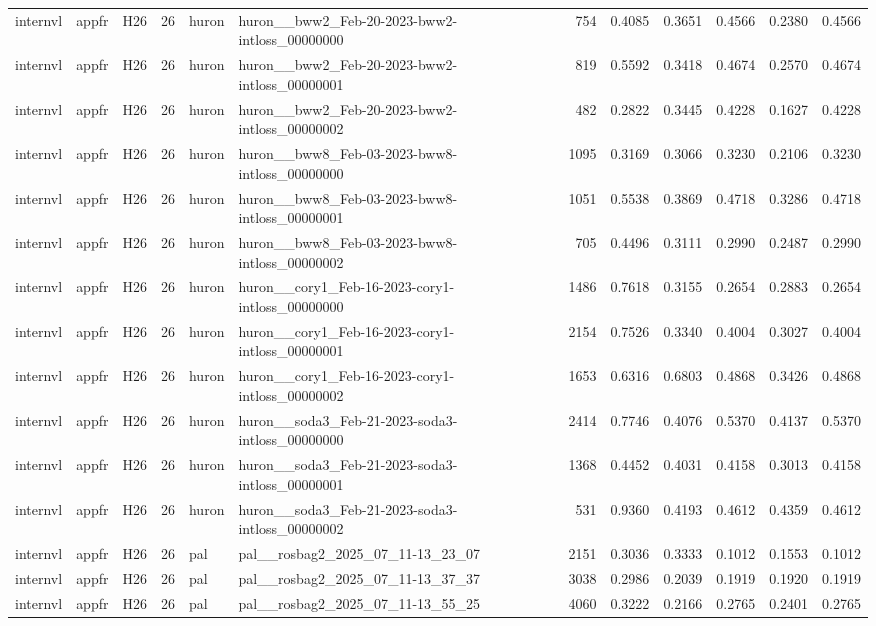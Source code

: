 \begin{table}[tbp]
\begin{tabular}{lllrllrrrrrr}
internvl & appfr & H26 & 26 & huron & huron\_\_bww2\_Feb-20-2023-bww2-intloss\_00000000 & 754 & 0.4085 & 0.3651 & 0.4566 & 0.2380 & 0.4566 \\
internvl & appfr & H26 & 26 & huron & huron\_\_bww2\_Feb-20-2023-bww2-intloss\_00000001 & 819 & 0.5592 & 0.3418 & 0.4674 & 0.2570 & 0.4674 \\
internvl & appfr & H26 & 26 & huron & huron\_\_bww2\_Feb-20-2023-bww2-intloss\_00000002 & 482 & 0.2822 & 0.3445 & 0.4228 & 0.1627 & 0.4228 \\
internvl & appfr & H26 & 26 & huron & huron\_\_bww8\_Feb-03-2023-bww8-intloss\_00000000 & 1095 & 0.3169 & 0.3066 & 0.3230 & 0.2106 & 0.3230 \\
internvl & appfr & H26 & 26 & huron & huron\_\_bww8\_Feb-03-2023-bww8-intloss\_00000001 & 1051 & 0.5538 & 0.3869 & 0.4718 & 0.3286 & 0.4718 \\
internvl & appfr & H26 & 26 & huron & huron\_\_bww8\_Feb-03-2023-bww8-intloss\_00000002 & 705 & 0.4496 & 0.3111 & 0.2990 & 0.2487 & 0.2990 \\
internvl & appfr & H26 & 26 & huron & huron\_\_cory1\_Feb-16-2023-cory1-intloss\_00000000 & 1486 & 0.7618 & 0.3155 & 0.2654 & 0.2883 & 0.2654 \\
internvl & appfr & H26 & 26 & huron & huron\_\_cory1\_Feb-16-2023-cory1-intloss\_00000001 & 2154 & 0.7526 & 0.3340 & 0.4004 & 0.3027 & 0.4004 \\
internvl & appfr & H26 & 26 & huron & huron\_\_cory1\_Feb-16-2023-cory1-intloss\_00000002 & 1653 & 0.6316 & 0.6803 & 0.4868 & 0.3426 & 0.4868 \\
internvl & appfr & H26 & 26 & huron & huron\_\_soda3\_Feb-21-2023-soda3-intloss\_00000000 & 2414 & 0.7746 & 0.4076 & 0.5370 & 0.4137 & 0.5370 \\
internvl & appfr & H26 & 26 & huron & huron\_\_soda3\_Feb-21-2023-soda3-intloss\_00000001 & 1368 & 0.4452 & 0.4031 & 0.4158 & 0.3013 & 0.4158 \\
internvl & appfr & H26 & 26 & huron & huron\_\_soda3\_Feb-21-2023-soda3-intloss\_00000002 & 531 & 0.9360 & 0.4193 & 0.4612 & 0.4359 & 0.4612 \\
internvl & appfr & H26 & 26 & pal & pal\_\_rosbag2\_2025\_07\_11-13\_23\_07 & 2151 & 0.3036 & 0.3333 & 0.1012 & 0.1553 & 0.1012 \\
internvl & appfr & H26 & 26 & pal & pal\_\_rosbag2\_2025\_07\_11-13\_37\_37 & 3038 & 0.2986 & 0.2039 & 0.1919 & 0.1920 & 0.1919 \\
internvl & appfr & H26 & 26 & pal & pal\_\_rosbag2\_2025\_07\_11-13\_55\_25 & 4060 & 0.3222 & 0.2166 & 0.2765 & 0.2401 & 0.2765 \\

\end{tabular}
\end{table}
